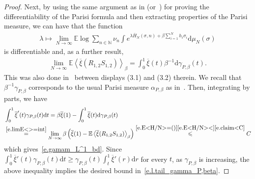 \documentclass[11pt]{amsart}
\theoremstyle{remark}
\theoremstyle{definition}
\numberwithin{equation}{section}
\numberwithin{proposition}{section}
\numberwithin{figure}{section}
\numberwithin{table}{section}
\newcommand{\N}{\mathbb{N}}
\newcommand{\E}{\mathbb{E}}
\renewcommand{\leq}{\leqslant}
\renewcommand{\geq}{\geqslant}
\renewcommand{\bar}{\overline}
\newcommand{\Ll}{\left}
\newcommand{\Rr}{\right}
\renewcommand{\d}{\mathrm{d}}
\newcommand{\1}{\mathbf{1}}
\newcommand{\la}{\left\langle}
\newcommand{\ra}{\right\rangle}
\begin{document}
\begin{proof}
Next, by using the same argument as in \cite{Panchenko2008} (or~\cite[Section~3.7]{pan}) for proving the differentiability of the Parisi formula and then extracting properties of the Parisi measure, we can have that the function
\begin{align*}
    \lambda \mapsto \lim_{N\to\infty} \E \log \sum_{n\in\N}\nu_n \int e^{\lambda \bar H_N(\sigma,n)+\beta \sum_{i=1}^Nh_i\sigma_i}\d \mu_N(\sigma)
\end{align*}
is differentiable and, as a further result,
\begin{align}\label{e.limE<>=int}
    \lim_{N\to\infty} \E \la \bar\xi(R_{1,2}S_{1,2})\ra_\beta = \int_0^1 \bar\xi(t) \beta^{-1}\d\gamma_{P,\beta}(t).
\end{align}
This was also done in~\cite{chen2017fluctuations} between displays (3.1) and (3.2) therein.
We recall that $\beta^{-1}\gamma_{P,\beta}$ corresponds to the usual Parisi measure $\alpha_{P,\beta}$ as in~\cite{auffinger2017parisi}.
Then, integrating by parts, we have
\begin{align*}
    &\int_0^1 \bar\xi'(t) \gamma_{P,\beta}(t)\d t = \beta\bar\xi(1) - \int_0^1\bar\xi(t)\d \gamma_{P,\beta}(t) 
    \\
    &\stackrel{\eqref{e.limE<>=int}}{=} \lim_{N\to\infty}\beta \Ll(\bar\xi(1) - \E \la \bar\xi(R_{1,2}S_{1,2})\ra_\beta\Rr) \stackrel{\eqref{e.E<H/N>=()}\eqref{e.E<H/N><}\eqref{e.claim<C}}{\leq} C
\end{align*}
which gives~\eqref{e.gamam_L^1_bd}.
Since $\int_0^1 \bar\xi'(t) \gamma_{P,\beta}(t)\d t \geq \gamma_{P,\beta}(t)\int_t^1\bar\xi'(r)\d r $ for every $t$, as $\gamma_{P,\beta}$ is increasing, the above inequality implies the desired bound in~\eqref{e.l.tail_gamma_P,beta}.


\end{proof}
\end{document}
